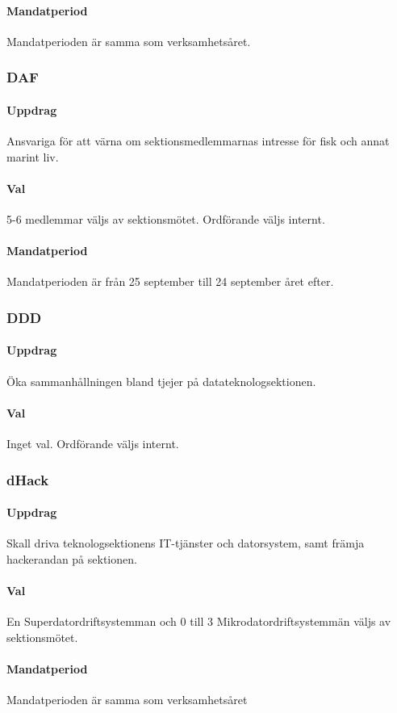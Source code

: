 \paragraph{Mandatperiod}
Mandatperioden är samma som verksamhetsåret. 
\subsubsection{DAF}
\paragraph{Uppdrag}
Ansvariga för att värna om sektionsmedlemmarnas intresse för fisk och
annat marint liv.
\paragraph{Val}
5-6 medlemmar väljs av sektionsmötet. Ordförande väljs internt.
\paragraph{Mandatperiod}
Mandatperioden är från 25 september till 24 september året efter.
\subsubsection{DDD}
\paragraph{Uppdrag}
Öka sammanhållningen bland tjejer på datateknologsektionen. 
\paragraph{Val}
Inget val. Ordförande väljs internt.
\subsubsection{dHack}
\paragraph{Uppdrag}
Skall driva teknologsektionens IT-tjänster och datorsystem, samt
främja hackerandan på sektionen.
\paragraph{Val}
En Superdatordriftsystemman och 0 till 3 Mikrodatordriftsystemmän väljs av sektionsmötet.
\paragraph{Mandatperiod}
Mandatperioden är samma som verksamhetsåret
